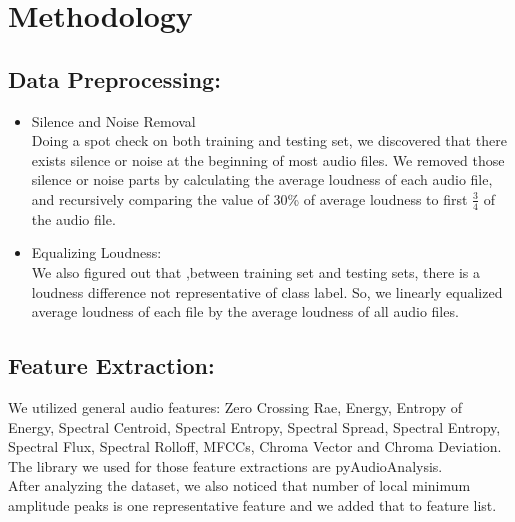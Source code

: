 \documentclass[conference]{IEEEtran}
\begin{document}
\section{Methodology}
\subsection{Data Preprocessing:}
\begin{itemize}
	\item Silence and Noise Removal\\
	Doing a spot check on both training and testing set, we discovered that there exists silence or noise at the beginning of most audio files. We removed those silence or noise parts by calculating the average loudness of each audio file, and recursively comparing the value of 30\% of average loudness to first $\frac{3}{4}$ of the audio file.\\
	\item Equalizing Loudness:\\
	We also figured out that ,between training set and testing sets, there is a loudness difference not representative of class label. So, we linearly equalized average loudness of each file by the average loudness of all audio files. \\
\end{itemize}
\subsection{Feature Extraction:}
	We utilized general audio features: Zero Crossing Rae, Energy, Entropy of Energy, Spectral Centroid, Spectral Entropy, Spectral Spread, Spectral Entropy, Spectral Flux, Spectral Rolloff,  MFCCs, Chroma Vector and Chroma Deviation. The library we used for those feature extractions are pyAudioAnalysis\cite{b1}.\\
	After analyzing the dataset, we also noticed that number of local minimum amplitude peaks is one representative feature and we added that to feature list.\\
\end{document}
